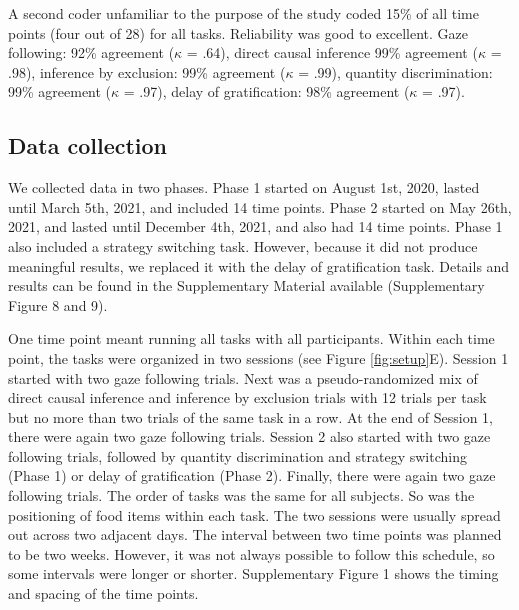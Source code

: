 \documentclass[
  man,floatsintext]{apa6}
\begin{document}
A second coder unfamiliar to the purpose of the study coded 15\% of all time points (four out of 28) for all tasks. Reliability was good to excellent. Gaze following: 92\% agreement (\(\kappa\) = .64), direct causal inference 99\% agreement (\(\kappa\) = .98), inference by exclusion: 99\% agreement (\(\kappa\) = .99), quantity discrimination: 99\% agreement (\(\kappa\) = .97), delay of gratification: 98\% agreement (\(\kappa\) = .97).

\hypertarget{data-collection}{%
\subsection{Data collection}\label{data-collection}}

We collected data in two phases. Phase 1 started on August 1st, 2020, lasted until March 5th, 2021, and included 14 time points. Phase 2 started on May 26th, 2021, and lasted until December 4th, 2021, and also had 14 time points. Phase 1 also included a strategy switching task. However, because it did not produce meaningful results, we replaced it with the delay of gratification task. Details and results can be found in the Supplementary Material available (Supplementary Figure 8 and 9).

One time point meant running all tasks with all participants. Within each time point, the tasks were organized in two sessions (see Figure \ref{fig:setup}E). Session 1 started with two gaze following trials. Next was a pseudo-randomized mix of direct causal inference and inference by exclusion trials with 12 trials per task but no more than two trials of the same task in a row. At the end of Session 1, there were again two gaze following trials. Session 2 also started with two gaze following trials, followed by quantity discrimination and strategy switching (Phase 1) or delay of gratification (Phase 2). Finally, there were again two gaze following trials. The order of tasks was the same for all subjects. So was the positioning of food items within each task. The two sessions were usually spread out across two adjacent days. The interval between two time points was planned to be two weeks. However, it was not always possible to follow this schedule, so some intervals were longer or shorter. Supplementary Figure 1 shows the timing and spacing of the time points.
\end{document}
